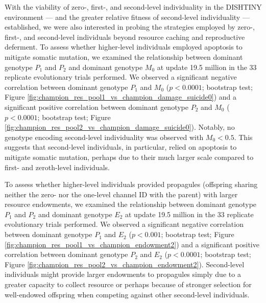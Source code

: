 With the viability of zero-, first-, and second-level individuality in the DISHTINY environment --- and the greater relative fitness of second-level individuality --- established, we were also interested in probing the strategies employed by zero-, first-, and second-level individuals beyond resource caching and reproductive deferment.
To assess whether higher-level individuals employed apoptosis to mitigate somatic mutation, we examined the relationship between dominant genotype $P_1$ and $P_2$ and dominant genotype $M_0$ at update 19.5 million in the 33 replicate evolutionary trials performed.
We observed a significant negative correlation between dominant genotype $P_1$ and $M_0$ ($p < 0.0001$; bootstrap test; Figure \ref{fig:champion_res_pool1_vs_champion_damage_suicide0}) and a significant positive correlation between dominant genotype $P_2$ and $M_0$ ($p < 0.0001$; bootstrap test; Figure \ref{fig:champion_res_pool2_vs_champion_damage_suicide0}).
Notably, no genotype encoding second-level individuality was observed with $M_0 < 0.5$.
This suggests that second-level individuals, in particular, relied on apoptosis to mitigate somatic mutation, perhaps due to their much larger scale compared to first- and zeroth-level individuals.

To assess whether higher-level individuals provided propagules (offspring sharing neither the zero- nor the one-level channel ID with the parent) with larger resource endowments, we examined the relationship between dominant genotype $P_1$ and $P_2$ and dominant genotype $E_2$ at update 19.5 million in the 33 replicate evolutionary trials performed.
We observed a significant negative correlation between dominant genotype $P_1$ and $E_2$ ($p < 0.001$; bootstrap test; Figure \ref{fig:champion_res_pool1_vs_champion_endowment2}) and a significant positive correlation between dominant genotype $P_2$ and $E_2$ ($p <  0.0001$; bootstrap test; Figure \ref{fig:champion_res_pool2_vs_champion_endowment2}).
Second-level individuals might provide larger endowments to propagules simply due to a greater capacity to collect resource or perhaps because of stronger selection for well-endowed offspring when competing against other second-level individuals.
